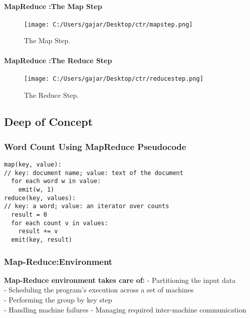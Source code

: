 \documentclass[
]{article}
\begin{document}
\hypertarget{mapreduce-the-map-step}{%
\paragraph{MapReduce :The Map Step}\label{mapreduce-the-map-step}}

\begin{figure}
\centering
\texttt{[image: C:/Users/gajar/Desktop/ctr/mapstep.png]}
\caption{The Map Step.}
\end{figure}

\hypertarget{mapreduce-the-reduce-step}{%
\paragraph{MapReduce :The Reduce Step}\label{mapreduce-the-reduce-step}}

\begin{figure}
\centering
\texttt{[image: C:/Users/gajar/Desktop/ctr/reducestep.png]}
\caption{The Reduce Step.}
\end{figure}

\hypertarget{deep-of-concept}{%
\subsection{Deep of Concept}\label{deep-of-concept}}

\hypertarget{word-count-using-mapreduce-pseudocode}{%
\subsubsection{Word Count Using MapReduce
Pseudocode}\label{word-count-using-mapreduce-pseudocode}}

\begin{verbatim}
map(key, value): 
// key: document name; value: text of the document
  for each word w in value:
    emit(w, 1) 
reduce(key, values):
// key: a word; value: an iterator over counts
  result = 0
  for each count v in values:
    result += v
  emit(key, result)
\end{verbatim}

\hypertarget{map-reduceenvironment}{%
\subsubsection{Map-Reduce:Environment}\label{map-reduceenvironment}}

\textbf{Map-Reduce environment takes care of:} - Partitioning the input
data\\
- Scheduling the program's execution across a set of machines\\
- Performing the group by key step\\
- Handling machine failures - Managing required inter-machine
communication
\end{document}
